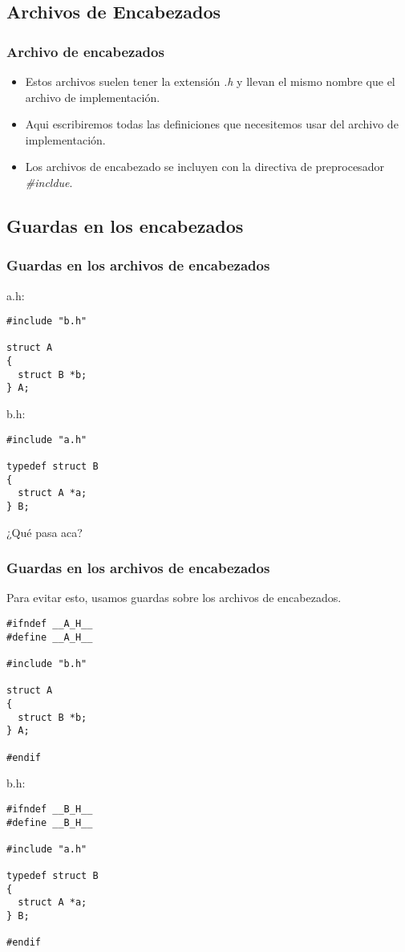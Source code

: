 \documentclass{beamer}
\begin{document}
\subsection{Archivos de Encabezados}
\begin{frame}
\frametitle{Archivo de encabezados}
\begin{itemize}
 \item Estos archivos suelen tener la extensión \emph{.h} y llevan el mismo nombre que el archivo de implementación.
 \item Aqui escribiremos todas las definiciones que necesitemos usar del archivo de implementación.
 \item Los archivos de encabezado se incluyen con la directiva de preprocesador \emph{\#incldue}.
\end{itemize}

\end{frame}

\subsection{Guardas en los encabezados}
\begin{frame}[fragile]
\frametitle{Guardas en los archivos de encabezados}
a.h:
\begin{verbatim}
#include "b.h"

struct A
{
  struct B *b;
} A;
\end{verbatim}

b.h:
\begin{verbatim}
#include "a.h"

typedef struct B
{
  struct A *a;
} B;
\end{verbatim}

¿Qué pasa aca?
\end{frame}

\begin{frame}[fragile]
\frametitle{Guardas en los archivos de encabezados}
Para evitar esto, usamos guardas sobre los archivos de encabezados.

\begin{verbatim}
#ifndef __A_H__
#define __A_H__

#include "b.h"

struct A
{
  struct B *b;
} A;

#endif
\end{verbatim}

b.h:
\begin{verbatim}
#ifndef __B_H__
#define __B_H__

#include "a.h"

typedef struct B
{
  struct A *a;
} B;

#endif
\end{verbatim}


\end{frame}
\end{document}
